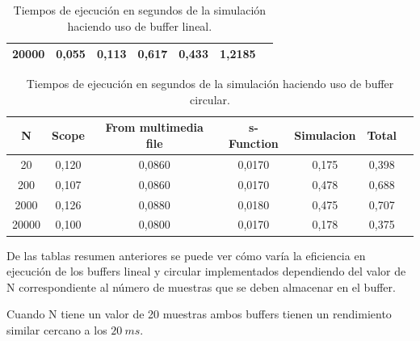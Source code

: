 \begin{enumerate}
\begin{table}[H]
\begin{tabular}{|c|c|c|c|c|c|c|}
 20000 & 0,055&	0,113	&0,617	&0,433&	1,2185\\
 \hline
 
        \end{tabular}
        \caption{Tiempos de ejecución en segundos de la simulación haciendo uso de  buffer lineal.}
        \label{lin_tabl}
    \end{table}





 \begin{table}[H]
        \centering
        \begin{tabular}{|c|c|c|c|c|c|c|}
        \hline
         N  & Scope & From multimedia file & s-Function & Simulacion & Total \\
         \hline
         20 & 0,120	 &0,0860&	0,0170	&0,175&	0,398 \\
         \hline
         200 & 0,107 &	0,0860	&0,0170&	0,478	&0,688 \\
         \hline
         2000 & 0,126	&0,0880&	0,0180&	0,475&	0,707 \\
         \hline
        
         20000 & 0,100 &	0,0800	&0,0170&	0,178	&0,375\\
         \hline

        \end{tabular}
        \caption{Tiempos de ejecución en segundos de la simulación haciendo uso de  buffer circular.}
        \label{circ_tabl}
    \end{table}





De las tablas resumen anteriores se puede ver  cómo varía la eficiencia en ejecución de los buffers lineal y circular implementados dependiendo del valor de N correspondiente al número de  muestras que se deben almacenar en el buffer.


Cuando N tiene un valor de 20 muestras  ambos buffers tienen un rendimiento similar cercano a los $20~ms$. 


\end{enumerate}
